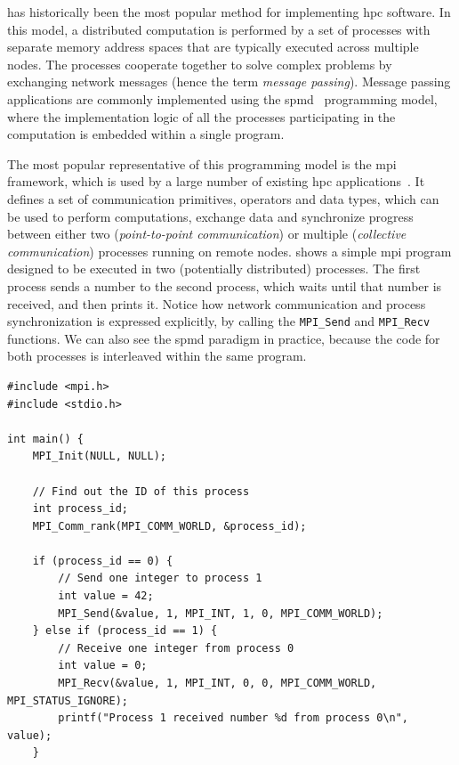 \begin{description}[wide=0pt]
	\item[Message passing] has historically been the most popular method for implementing \gls{hpc} software. In
		this model, a distributed computation is performed by a set of processes with separate memory
		address spaces that are typically executed across multiple nodes. The processes cooperate together
		to solve complex problems by exchanging network messages (hence the term \emph{message passing}).
		Message passing applications are commonly implemented using the
		\gls{spmd}~\cite{spmd} programming model, where the implementation logic of
		all the processes participating in the computation is embedded within a single program.

		The most popular representative of this programming model is the
		\gls{mpi}~\cite{mpi} framework, which is used by a large number of
		existing \gls{hpc} applications~\cite{mpiusagestudy2}. It defines a set of
		communication primitives, operators and data types, which can be used to perform computations,
		exchange data and synchronize progress between either two (\emph{point-to-point communication}) or multiple
		(\emph{collective communication}) processes running on remote nodes.  shows a simple
		\gls{mpi} program designed to be executed in two (potentially distributed) processes.
		The first process sends a number to the second process, which waits until that number is received,
		and then prints it. Notice how network communication and process synchronization is expressed
		explicitly, by calling the \texttt{MPI\_Send} and \texttt{MPI\_Recv} functions. We can also
		see the \gls{spmd} paradigm in practice, because the code for both processes is
		interleaved within the same program.

		\begin{listing}[h]
			\begin{verbatim}
#include <mpi.h>
#include <stdio.h>

int main() {
	MPI_Init(NULL, NULL);

	// Find out the ID of this process
	int process_id;
	MPI_Comm_rank(MPI_COMM_WORLD, &process_id);

	if (process_id == 0) {
		// Send one integer to process 1
		int value = 42;
		MPI_Send(&value, 1, MPI_INT, 1, 0, MPI_COMM_WORLD);
	} else if (process_id == 1) {
		// Receive one integer from process 0
		int value = 0;
		MPI_Recv(&value, 1, MPI_INT, 0, 0, MPI_COMM_WORLD, MPI_STATUS_IGNORE);
		printf("Process 1 received number %d from process 0\n", value);
	}


\end{verbatim}
\end{listing}
\end{description}
